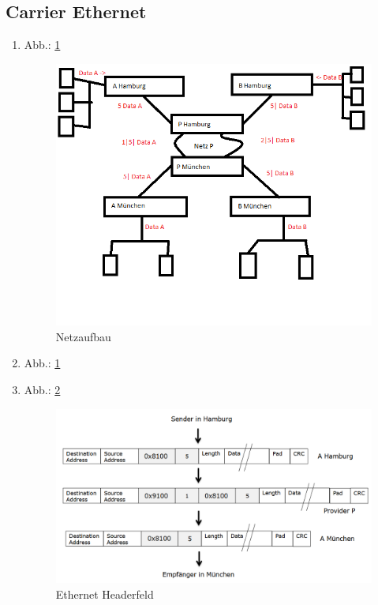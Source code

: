 \subsection{Carrier Ethernet}
\begin{enumerate}
	\item Abb.: \ref{img:Netzaufbau}
	\begin{figure}
		\centering
		\includegraphics[width = 12cm]{./Rechnernetze/Images/4_3ab.png}
		\caption{Netzaufbau}
		\label{img:Netzaufbau}
	\end{figure}
	\item Abb.: \ref{img:Netzaufbau}
	\item Abb.: \ref{img:EthernetHeaderfeld}
	\begin{figure}
		\centering
		\includegraphics[width = 16cm]{./Rechnernetze/Images/4_3c.png}
		\caption{Ethernet Headerfeld}
		\label{img:EthernetHeaderfeld}
	\end{figure}
\end{enumerate}
